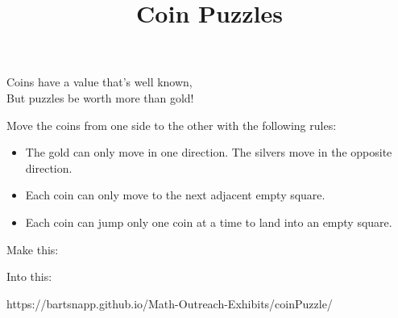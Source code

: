 \documentclass{../exhibit}
\title{Coin Puzzles}
\begin{document}
\begin{context}
  Coins have a value that's well known,
  \\[1cm]
  But puzzles be worth more than gold!
\end{context}

\begin{directions}
  Move the coins from one side to the other with the following rules:
\begin{itemize}
\item The gold can only move in one direction. The silvers move in the opposite direction.
\item Each coin can only move to the next adjacent empty square.
\item Each coin can jump only one coin at a time to land into an empty
  square.
\end{itemize}
\end{directions}


\begin{example}
  Make this:
  \begin{center}
  \end{center}
Into this:
  \begin{center}
  \end{center}
\end{example}


\begin{mathConnections}
  https://bartsnapp.github.io/Math-Outreach-Exhibits/coinPuzzle/
\end{mathConnections}
\end{document}
